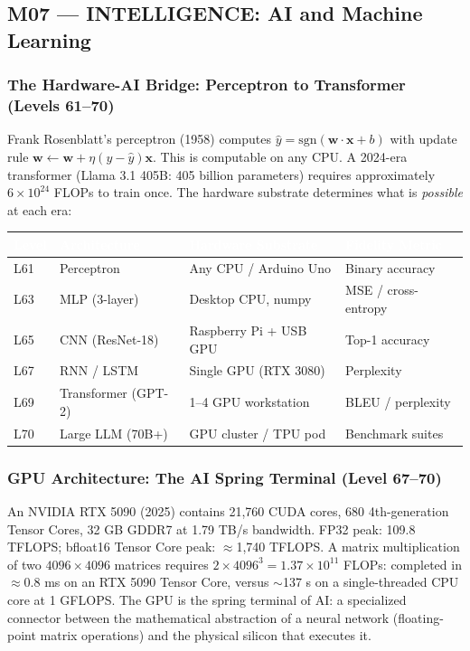 \documentclass[11pt,letterpaper]{article}
\newcommand{\tableheader}[1]{\textbf{\sffamily\textcolor{white}{#1}}}
\begin{document}
\subsection{M07 --- INTELLIGENCE: AI and Machine Learning}

\subsubsection{The Hardware-AI Bridge: Perceptron to Transformer (Levels 61--70)}

Frank Rosenblatt's perceptron (1958) computes $\hat{y} = \text{sgn}(\mathbf{w} \cdot \mathbf{x} + b)$
with update rule $\mathbf{w} \leftarrow \mathbf{w} + \eta(y - \hat{y})\mathbf{x}$. This is
computable on any CPU. A 2024-era transformer (Llama 3.1 405B: 405 billion parameters) requires
approximately $6 \times 10^{24}$ FLOPs to train once. The hardware substrate determines what is
\textit{possible} at each era:

\begin{center}
\begin{tabularx}{\textwidth}{L{1.5cm}L{3.5cm}XL{2.5cm}}
\toprule
{}
\tableheader{Level} & \tableheader{Architecture} & \tableheader{Hardware Substrate} & \tableheader{Fidelity Metric} \\
\midrule
L61 & Perceptron & Any CPU / Arduino Uno & Binary accuracy \\
L63 & MLP (3-layer) & Desktop CPU, numpy & MSE / cross-entropy \\
L65 & CNN (ResNet-18) & Raspberry Pi + USB GPU & Top-1 accuracy \\
L67 & RNN / LSTM & Single GPU (RTX 3080) & Perplexity \\
L69 & Transformer (GPT-2) & 1--4 GPU workstation & BLEU / perplexity \\
L70 & Large LLM (70B+) & GPU cluster / TPU pod & Benchmark suites \\
\bottomrule
\end{tabularx}
\end{center}

\subsubsection{GPU Architecture: The AI Spring Terminal (Level 67--70)}

An NVIDIA RTX 5090 (2025) contains 21,760 CUDA cores, 680 4th-generation Tensor Cores,
32 GB GDDR7 at 1.79 TB/s bandwidth. FP32 peak: 109.8 TFLOPS; bfloat16 Tensor Core peak:
$\approx$1,740 TFLOPS. A matrix multiplication of two $4096 \times 4096$ matrices requires
$2 \times 4096^3 = 1.37 \times 10^{11}$ FLOPs: completed in $\approx$0.8 ms on an RTX 5090
Tensor Core, versus $\sim$137 s on a single-threaded CPU core at 1 GFLOPS. The GPU is the
spring terminal of AI: a specialized connector between the mathematical abstraction of a neural
network (floating-point matrix operations) and the physical silicon that executes it.
\end{document}
